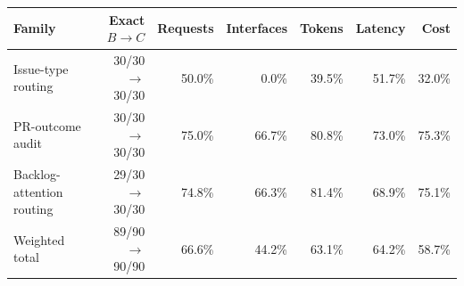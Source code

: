 \begin{tabular}{@{}lrrrrrr@{}}
\toprule
Family & Exact $B\!\to\!C$ & Requests & Interfaces & Tokens & Latency & Cost \\
\midrule
Issue-type routing & 30/30$\to$30/30 & 50.0\% & 0.0\% & 39.5\% & 51.7\% & 32.0\% \\
PR-outcome audit & 30/30$\to$30/30 & 75.0\% & 66.7\% & 80.8\% & 73.0\% & 75.3\% \\
Backlog-attention routing & 29/30$\to$30/30 & 74.8\% & 66.3\% & 81.4\% & 68.9\% & 75.1\% \\
\midrule
Weighted total & 89/90$\to$90/90 & 66.6\% & 44.2\% & 63.1\% & 64.2\% & 58.7\% \\
\bottomrule
\end{tabular}
